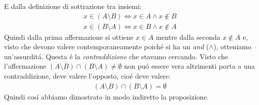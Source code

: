 \documentclass[twoside]{article} %
\begin{document}
	E dalla definizione di sottrazione tra insiemi:
	\begin{gather*}
		x\in (A\setminus B)\Leftrightarrow x\in A \wedge x\notin B\\ 
		x\in (B\setminus A)\Leftrightarrow x\in B \wedge x\notin A	
	\end{gather*}	
	Quindi dalla prima affermazione si ottiene $x\in A$ mentre dalla seconda $x\notin A$ e, visto che devono valere contemporaneamente poich\'e si ha un \textit{and} ($\wedge$), otteniamo un'assurdit\'a. Questa \'e la \textit{contraddizione} che stavamo cercando. Visto che l'affermazione $(A\setminus B)\cap (B\setminus A)\neq\emptyset$ non pu\'o essere vera altrimenti porta a una contraddizione, deve valere l'opposto, cio\'e deve valere:
	\begin{gather*}
		(A\setminus B)\cap (B\setminus A)=\emptyset
	\end{gather*}
	Quindi cos\'i abbiamo dimostrato in modo indiretto la proposizione.
	\newpage
	
\end{document}
